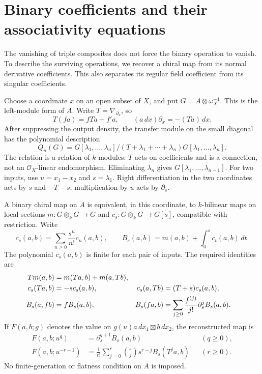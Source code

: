 \section{Binary coefficients and their associativity equations}
\label{e1c:sec:coefficients}

The vanishing of triple composites does not force the binary
operation to vanish. To describe the surviving operations, we
recover a chiral map from its normal derivative coefficients.
This also separates its regular field coefficient from its
singular coefficients.

Choose\label{e1c:def:left-coefficients} a coordinate \(x\) on an open subset of \(X\), and put
\(G=A\otimes\omega_X^{-1}\). This is the left-module form of
\(A\). Write \(T=\nabla_{\partial_x}\), so
\[
 T(fa)=fTa+f'a,
 \qquad (a\,dx)\partial_x=-(Ta)\,dx.
\]
After suppressing the output density, the transfer module on
the small diagonal has the polynomial description
\begin{equation}\label{e1c:eq:normal}
 Q_n(G)=G[\lambda_1,\ldots,\lambda_n]
     /(T+\lambda_1+\cdots+\lambda_n)G[\lambda_1,\ldots,\lambda_n].
\end{equation}
The relation is a relation of \(k\)-modules: \(T\) acts on
coefficients and is a connection, not an \(\mathcal O_X\)-linear
endomorphism. Eliminating \(\lambda_n\) gives
\(G[\lambda_1,\ldots,\lambda_{n-1}]\).
For\label{e1c:def:binary-transfer-coordinates} two inputs, use \(u=x_1-x_2\) and \(s=\lambda_1\).
Right differentiation in the two coordinates acts by \(s\)
and \(-T-s\); multiplication by \(u\) acts by \(\partial_s\).

\begin{proposition}\label{e1c:prop:binary}
A binary chiral map on \(A\) is equivalent, in this coordinate,
to \(k\)-bilinear maps on local sections
\(m:G\otimes_kG\to G\) and
\(c_s:G\otimes_kG\to G[s]\), compatible with restriction.
Write
\[
 c_s(a,b)=\sum_{n\geq0}\frac{s^n}{n!}c_n(a,b),
 \qquad
 B_s(a,b)=m(a,b)+\int_0^s c_t(a,b)\,dt.
\]
The polynomial \(c_s(a,b)\) is finite for each pair of inputs.
The required identities are
\begin{align}
 Tm(a,b)&=m(Ta,b)+m(a,Tb),\notag\\
 c_s(Ta,b)&=-s c_s(a,b),&
 c_s(a,Tb)&=(T+s)c_s(a,b),\label{e1c:eq:sesqui}\\
 B_s(a,fb)&=fB_s(a,b),&
 B_s(fa,b)&=\sum_{j\geq0}\frac{f^{(j)}}{j!}
                         \partial_s^jB_s(a,b).
 \label{e1c:eq:functions}
\end{align}
If \(F(a,b;g)\) denotes the value on
\(g(u)a\,dx_1\boxtimes b\,dx_2\), the reconstructed map is
\begin{align}
 F(a,b;u^q)&=\partial_s^{q+1}B_s(a,b)
                      &&(q\geq0),\label{e1c:eq:positive}\\
 F(a,b;u^{-r-1})&=\frac1{r!}\sum_{j=0}^r\binom rj
                         s^{r-j}B_s(T^ja,b)
                      &&(r\geq0).\label{e1c:eq:negative}
\end{align}
No finite-generation or flatness condition on \(A\) is imposed.
\end{proposition}

